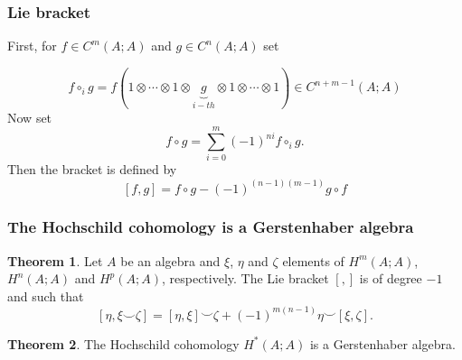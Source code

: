 \documentclass{beamer}
\theoremstyle{definition}
\newtheorem{teorema}{Theorem}
\begin{document}
\begin{frame}
\frametitle{Lie bracket}
First, for $f\in C^m(A;A)$ and $g\in C^n(A;A)$ set

$$
f\circ_i g=f(1\otimes\cdots \otimes 1\otimes \underbrace{g}_{i-th}\otimes 1\otimes \cdots\otimes 1)\in C^{n+m-1}(A;A)
$$
\pause 
Now set
\[
f\circ g=\sum_{i=0}^m (-1)^{ni}f\circ_i g.
\]\pause
Then the bracket is defined by $$[f,g]=f\circ g-(-1)^{(n-1)(m-1)}g\circ f$$
\end{frame}

\begin{frame}
	\frametitle{The Hochschild cohomology is a Gerstenhaber algebra}
	
	\begin{teorema}
		Let $A$ be an algebra and $\xi$, $\eta$ and $\zeta$ elements of $H^m(A;A)$, $H^n(A;A)$ and $H^p(A;A)$, respectively. The Lie bracket $[,]$ is of degree $-1$ and such that
		\[
		[\eta, \xi\smile \zeta]=[\eta,\xi]\smile \zeta+(-1)^{m(n-1)}\eta\smile[\xi,\zeta].
		\]
	\end{teorema}\pause
	\begin{teorema}
	The Hochschild cohomology $H^*(A;A)$ is a Gerstenhaber algebra.
\end{teorema} 
\end{frame}
\end{document}
